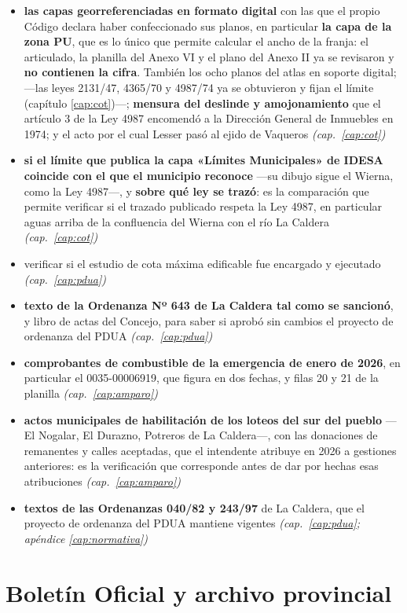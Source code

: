 \begin{itemize}[leftmargin=*]
\item \textbf{las capas georreferenciadas en formato digital} con las que el propio
Código declara haber confeccionado sus planos, en particular \textbf{la capa de la zona PU},
que es lo único que permite calcular el ancho de la franja: el articulado, la planilla del
Anexo VI y el plano del Anexo II ya se revisaron y \textbf{no contienen la cifra}. También los
ocho planos del atlas en soporte digital; ---las leyes 2131/47, 4365/70 y 4987/74 ya se obtuvieron y fijan el límite (capítulo \ref{cap:cot})---; \textbf{mensura del deslinde y amojonamiento} que el artículo 3 de la Ley 4987 encomendó a la Dirección General de Inmuebles en 1974; y el acto por el cual Lesser pasó al ejido de Vaqueros \textit{(cap.\ \ref{cap:cot})}
\item \textbf{si el límite que publica la capa «Límites Municipales» de IDESA coincide con el que el municipio reconoce} ---su dibujo sigue el Wierna, como la Ley 4987---, y \textbf{sobre qué ley se trazó}: es la comparación que permite verificar si el trazado publicado respeta la Ley 4987, en particular aguas arriba de la confluencia del Wierna con el río La Caldera \textit{(cap.\ \ref{cap:cot})}
\item verificar si el estudio de cota máxima edificable fue encargado y ejecutado \textit{(cap.\ \ref{cap:pdua})}
\item \textbf{texto de la Ordenanza Nº 643 de La Caldera tal como se sancionó}, y libro de actas del Concejo, para saber si aprobó sin cambios el proyecto de ordenanza del PDUA \textit{(cap.\ \ref{cap:pdua})}
\item \textbf{comprobantes de combustible de la emergencia de enero de 2026}, en particular el 0035-00006919, que figura en dos fechas, y filas 20 y 21 de la planilla \textit{(cap.\ \ref{cap:amparo})}
\item \textbf{actos municipales de habilitación de los loteos del sur del pueblo} ---El Nogalar, El Durazno, Potreros de La Caldera---, con las donaciones de remanentes y calles aceptadas, que el intendente atribuye en 2026 a gestiones anteriores: es la verificación que corresponde antes de dar por hechas esas atribuciones \textit{(cap.\ \ref{cap:amparo})}
\item \textbf{textos de las Ordenanzas 040/82 y 243/97} de La Caldera, que el proyecto de ordenanza del PDUA mantiene vigentes \textit{(cap.\ \ref{cap:pdua}; apéndice \ref{cap:normativa})}
\end{itemize}

\section{Boletín Oficial y archivo provincial}


